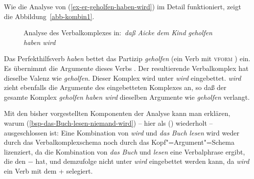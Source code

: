 Wie die Analyse von (\ref{ex-er-geholfen-haben-wird}) im Detail funktioniert, zeigt die Abbildung~\vref{abb-kombin1}.
\begin{figure}
\caption{Analyse des Verbalkomplexes in:\ \emph{daß Aicke dem Kind geholfen haben wird}}\label{abb-kombin1}%
\end{figure}
Das Perfekthilfsverb \emph{haben} bettet das Partizip \emph{geholfen} (ein Verb mit \textsc{vform} )
ein. Es übernimmt die Argumente dieses Verbs . Der resultierende Verbalkomplex hat dieselbe
Valenz wie \emph{geholfen}. Dieser Komplex wird unter \emph{wird} eingebettet. \emph{wird} zieht
ebenfalls die Argumente des eingebetteten Komplexes an, so daß der gesamte Komplex \emph{geholfen haben wird}
dieselben Argumente wie \emph{geholfen} verlangt.

Mit den bisher vorgestellten Komponenten der Analyse kann man erklären, warum
(\ref{bsp-das-Buch-lesen-niemand-wird}) -- hier als () wiederholt --
ausgeschlossen ist:
\z
Eine Kombination von \emph{wird} und \emph{das Buch lesen} wird weder durch das Verbalkomplexschema
noch durch das Kopf"=Argument"=Schema lizenziert, da die Kombination von \emph{das Buch} und \emph{lesen} 
eine Verbalphrase ergibt, die den \lexw $-$ hat, 
und demzufolge nicht unter \emph{wird} eingebettet werden kann, da \emph{wird} ein Verb mit
dem \lexw + selegiert.

